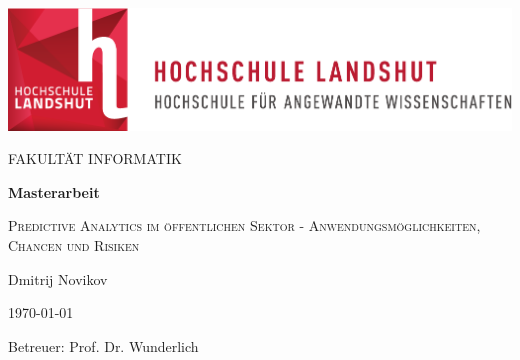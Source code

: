 \thispagestyle{empty}
\begin{titlepage}
	\vspace{3cm}



\begin{center}
	\includegraphics[scale=0.8]{Grafiken/hl-logo.pdf}  
\end{center}

\vspace{2.5cm}

\begin{center}
  \Large FAKULTÄT INFORMATIK
\end{center}

\vspace{1cm}
\begin{center}
	\Huge
	\textbf{Masterarbeit}\\
\end{center}

\vspace{1cm}

\begin{center}
	\Large
	\textsc{Predictive Analytics im öffentlichen Sektor - Anwendungsmöglichkeiten,
    Chancen und Risiken}\\
\end{center}

\vspace{1.5cm}

\begin{center}
	\Large
	Dmitrij Novikov
\end{center}

\vspace{2cm}
\begin{center}
	\large
  \today
\end{center}

\vspace{2cm}
\begin{center}
	\large
	Betreuer: Prof. Dr. Wunderlich
\end{center}

\end{titlepage}
